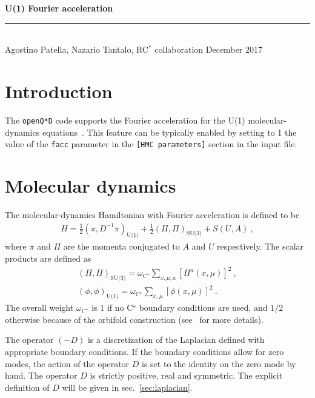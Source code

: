 \documentclass[11pt,fleqn]{article}
\begin{document}
\vspace*{20mm}

{
\sffamily
\huge
\textbf{U(1) Fourier acceleration}
\\
\rule{\textwidth}{1pt}
\\[2mm]
\large
Agostino Patella, Nazario Tantalo, RC$^*$ collaboration
\hfill
December 2017
}

\vspace{30mm}


\tableofcontents

\pagebreak


\section{Introduction}

The \texttt{openQ*D} code supports the Fourier acceleration for the U(1) molecular-dynamics equations~\cite{Duane:1986fy}. This feature can be typically enabled by setting to 1 the value of the \texttt{facc} parameter in the \texttt{[HMC parameters]} section in the input file.


\section{Molecular dynamics}

The molecular-dynamics Hamiltonian with Fourier acceleration is defined to be
\begin{gather}
   H = \frac{1}{2} ( \pi , D^{-1} \pi )_\text{U(1)} + \frac{1}{2} ( \Pi , \Pi )_\text{SU(3)} + S(U,A) \ ,
\end{gather}
where $\pi$ and $\Pi$ are the momenta conjugated to $A$ and $U$ respectively. The scalar products are defined as
\begin{gather}
   ( \Pi , \Pi )_\text{SU(3)} = \omega_{\text{C}^\star} \sum_{x,\mu,a} [\Pi^a(x,\mu)]^2 \ , \\
   ( \phi , \phi )_\text{U(1)} = \omega_{\text{C}^\star} \sum_{x,\mu} [\phi(x,\mu)]^2 \ .
\end{gather}
The overall weight $\omega_{\text{C}^\star}$ is $1$ if no C$^\star$ boundary conditions are used, and $1/2$ otherwise because of the orbifold construction (see~\cite{cstar} for more details).

The operator $(-D)$ is a discretization of the Laplacian defined with appropriate boundary conditions. If the boundary conditions allow for zero modes, the action of the operator $D$ is set to the identity on the zero mode by hand. The operator $D$ is strictly positive, real and symmetric. The explicit definition of $D$ will be given in sec.~\ref{sec:laplacian}.
\end{document}
